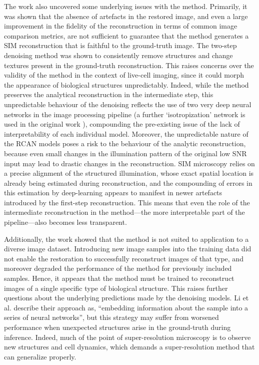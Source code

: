 \documentclass[12pt]{article}
\begin{document}
The work also uncovered some underlying issues with the method.
Primarily, it was shown that the absence of artefacts in the restored image,
and even a large improvement in the fidelity of the reconstruction in terms of common image comparison metrics,
are not sufficient to guarantee that the method generates a SIM reconstruction that is faithful to the ground-truth image.
The two-step denoising method was shown to consistently remove structures and change textures present in the ground-truth reconstruction.
This raises concerns over the validity of the method in the context of live-cell imaging,
since it could morph the appearance of biological structures unpredictably.
Indeed, while the method preserves the analytical reconstruction in the intermediate step,
this unpredictable behaviour of the denoising reflects the use of two very deep neural networks in the image processing pipeline
(a further `isotropization' network is used in the original work \cite{keypaper}),
compounding the pre-existing issue of the lack of interpretability of each individual model.
Moreover, the unpredictable nature of the RCAN models poses a risk to the behaviour of the analytic reconstruction,
because even small changes in the illumination pattern of the original low SNR input may lead to drastic changes in the reconstruction.
SIM microscopy relies on a precise alignment of the structured illumination,
whose exact spatial location is already being estimated during reconstruction,
and the compounding of errors in this estimation by deep-learning appears to manifest in newer artefacts introduced by the first-step reconstruction.
This means that even the role of the intermediate reconstruction in the method---the more interpretable part of the pipeline---also becomes less transparent.

Additionally, the work showed that the method is not suited to application to a diverse image dataset.
Introducing new image samples into the training data did not enable the restoration to successfully reconstruct images of that type,
and moreover degraded the performance of the method for previously included samples.
Hence, it appears that the method must be trained to reconstruct images of a single specific type of biological structure.
This raises further questions about the underlying predictions made by the denoising models.
Li et al. describe their approach as, ``embedding information about the sample into a series of neural networks''\cite{keypaper},
but this strategy may suffer from worsened performance when unexpected structures arise in the ground-truth during inference.
Indeed, much of the point of super-resolution microscopy is to observe new structures and cell dynamics,
which demands a super-resolution method that can generalize properly.
\end{document}
